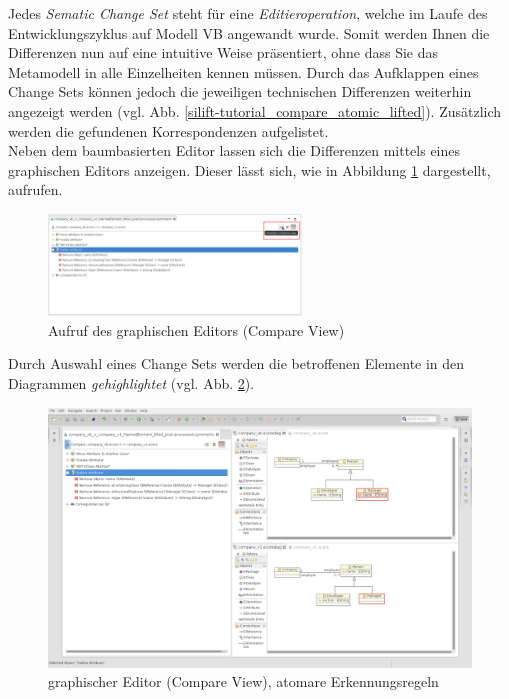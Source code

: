\documentclass[a4paper]{scrartcl}
\begin{document}
Jedes \textit{Sematic Change Set} steht für eine \textit{Editieroperation}, welche im Laufe des Entwicklungszyklus auf Modell VB angewandt wurde.
Somit werden Ihnen die Differenzen nun auf eine intuitive Weise präsentiert, ohne dass Sie das Metamodell in alle Einzelheiten kennen müssen.
Durch das Aufklappen eines Change Sets können jedoch die jeweiligen technischen Differenzen weiterhin angezeigt werden (vgl. Abb. \ref{silift-tutorial_compare_atomic_lifted}).
Zusätzlich werden die gefundenen Korrespondenzen aufgelistet.\\
Neben dem baumbasierten Editor lassen sich die Differenzen mittels eines graphischen Editors anzeigen.
Dieser lässt sich, wie in Abbildung \ref{silift-tutorial_compare_arrange_compare_view} dargestellt, aufrufen.

\begin{figure}[H]
\centering
\includegraphics[width=0.6\textwidth]{graphics/silift-tutorial_compare_arrange_compare_view.png}
\caption{Aufruf des graphischen Editors (Compare View)}
\label{silift-tutorial_compare_arrange_compare_view}
\end{figure}

Durch Auswahl eines Change Sets werden die betroffenen Elemente in den Diagrammen \textit{gehighlightet} (vgl. Abb. \ref{silift-tutorial_compare_compare_view}).

\begin{figure}[H]
\centering
\includegraphics[width=\textwidth]{graphics/silift-tutorial_compare_compare_view.png}
\caption{graphischer Editor (Compare View), atomare Erkennungsregeln}
\label{silift-tutorial_compare_compare_view}
\end{figure}
\end{document}
